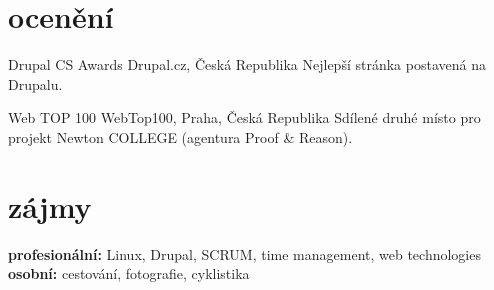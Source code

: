 \documentclass[]{friggeri-cv} %
\begin{document}

\section{ocenění}

\begin{entrylist}
\entry
{\parbox[t]{2cm}{}}
{Drupal CS Awards}
{Drupal.cz, Česká Republika}
{Nejlepší stránka postavená na Drupalu.}
\entry
{\parbox[t]{2cm}{}}
{Web TOP 100}
{WebTop100, Praha, Česká Republika}
{Sdílené druhé místo pro projekt Newton COLLEGE (agentura Proof \& Reason).}
\end{entrylist}


\section{zájmy}

\textbf{profesionální:} Linux, Drupal, SCRUM, time management, web technologies \\
\textbf{osobní:} cestování, fotografie, cyklistika
\end{document}
